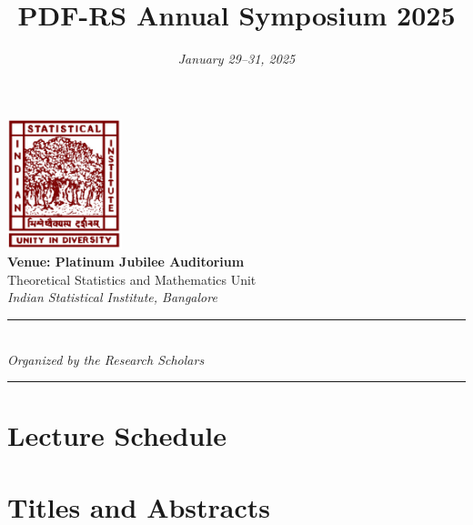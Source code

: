\documentclass[a4paper,12pt]{article}
\title{\Huge\textbf{PDF-RS Annual Symposium 2025}}
\author{} %
\date{\vspace{-1cm}\Large\textit{January 29--31, 2025}}
\begin{document}
	
	\maketitle
	\thispagestyle{empty} %
	
	\begin{center}
		\vspace{1.5cm}
		\includegraphics[width=0.25\textwidth]{images/isi_logo.png} \\[1.5cm]
		
		{\Huge\textbf{Venue: Platinum Jubilee Auditorium}} \\[0.4cm]
		{\Large Theoretical Statistics and Mathematics Unit} \\[0.3cm]
		{\large \textit{Indian Statistical Institute, Bangalore}} \\[2cm]
		
		\rule{\textwidth}{0.5pt} \\[0.6cm]
		{\Large\textit{Organized by the Research Scholars}} \\[0.6cm]
		\rule{\textwidth}{0.5pt}
	\end{center}
	
	\newpage
	
	\section*{Lecture Schedule}
	
	\newpage
	
	\section*{Titles and Abstracts}

    
    

    
	
\end{document}
